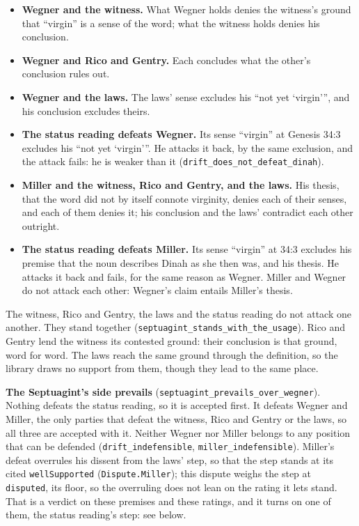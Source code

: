 \documentclass[11pt]{article}
\begin{document}
\begin{itemize}
  \item \textbf{Wegner and the witness.} What Wegner holds denies the witness’s ground that “virgin” is a sense of the word; what the witness holds denies his conclusion.
  \item \textbf{Wegner and Rico and Gentry.} Each concludes what the other’s conclusion rules out.
  \item \textbf{Wegner and the laws.} The laws’ sense excludes his “not yet ‘virgin’”, and his conclusion excludes theirs.
  \item \textbf{The status reading defeats Wegner.} Its sense “virgin” at Genesis 34:3 excludes his “not yet ‘virgin’”. He attacks it back, by the same exclusion, and the attack fails: he is weaker than it (\texttt{drift\_\allowbreak{}does\_\allowbreak{}not\_\allowbreak{}defeat\_\allowbreak{}dinah}).
  \item \textbf{Miller and the witness, Rico and Gentry, and the laws.} His thesis, that the word did not by itself connote virginity, denies each of their senses, and each of them denies it; his conclusion and the laws’ contradict each other outright.
  \item \textbf{The status reading defeats Miller.} Its sense “virgin” at 34:3 excludes his premise that the noun describes Dinah as she then was, and his thesis. He attacks it back and fails, for the same reason as Wegner. Miller and Wegner do not attack each other: Wegner’s claim entails Miller’s thesis.
\end{itemize}
The witness, Rico and Gentry, the laws and the status reading do not attack one another. They stand together (\texttt{septuagint\_\allowbreak{}stands\_\allowbreak{}with\_\allowbreak{}the\_\allowbreak{}usage}). Rico and Gentry lend the witness its contested ground: their conclusion is that ground, word for word. The laws reach the same ground through the definition, so the library draws no support from them, though they lead to the same place.

\textbf{The Septuagint’s side prevails} (\texttt{septuagint\_\allowbreak{}prevails\_\allowbreak{}over\_\allowbreak{}wegner}). Nothing defeats the status reading, so it is accepted first. It defeats Wegner and Miller, the only parties that defeat the witness, Rico and Gentry or the laws, so all three are accepted with it. Neither Wegner nor Miller belongs to any position that can be defended (\texttt{drift\_\allowbreak{}indefensible}, \texttt{miller\_\allowbreak{}indefensible}). Miller’s defeat overrules his dissent from the laws’ step, so that the step stands at its cited \texttt{well\allowbreak{}Supported} (\texttt{Dispute.Miller}); this dispute weighs the step at \texttt{disputed}, its floor, so the overruling does not lean on the rating it lets stand. That is a verdict on these premises and these ratings, and it turns on one of them, the status reading’s step: see below.
\end{document}
